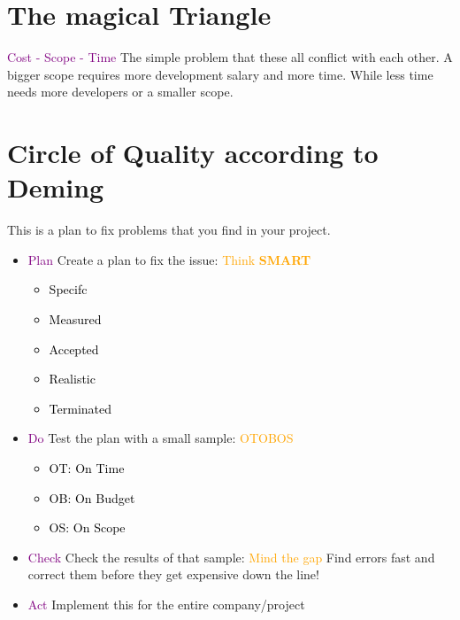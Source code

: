 \documentclass[main.tex,fontsize=12pt,paper=a4,paper=landscape,DIV=calc,]{scrartcl}
\begin{document}
\tableofcontents
\pagebreak 

\begin{multicols*}{2}
\section{The magical Triangle}
\textcolor{purple}{Cost - Scope - Time}
The simple problem that these all conflict with each other.\newline
A bigger scope requires more development salary and more time.\newline
While less time needs more developers or a smaller scope.

\section{Circle of Quality according to Deming}
This is a plan to fix problems that you find in your project.\newline
\begin{itemize}
\item \textcolor{purple}{Plan}\newline
  Create a plan to fix the issue:\newline
  \textcolor{orange}{Think \textbf{SMART}}\newline
  \begin{itemize}
  \item \textcolor{black}{Specifc}
  \item \textcolor{black}{Measured}
  \item \textcolor{black}{Accepted}
  \item \textcolor{black}{Realistic}
  \item \textcolor{black}{Terminated}
  \end{itemize} 
\item \textcolor{purple}{Do}\newline 
  Test the plan with a small sample:\newline
  \textcolor{orange}{OTOBOS}\newline
  \begin{itemize}
  \item \textcolor{black}{OT: On Time}
  \item \textcolor{black}{OB: On Budget}
  \item \textcolor{black}{OS: On Scope}
  \end{itemize} 
\item \textcolor{purple}{Check}\newline
  Check the results of that sample:\newline
  \textcolor{orange}{Mind the gap}\newline
  Find errors fast and correct them before they get expensive down the line!
\item \textcolor{purple}{Act}\newline
  Implement this for the entire company/project
\end{itemize} 


\end{multicols*}
\end{document}
